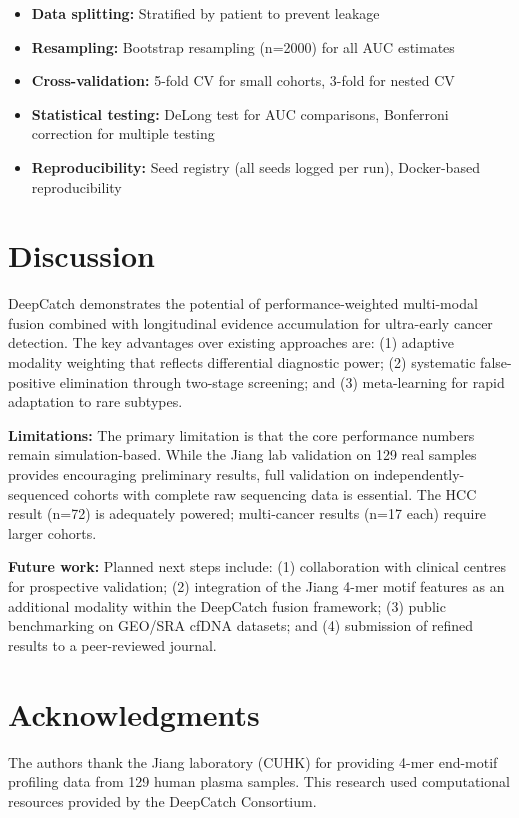 \documentclass[11pt,a4paper]{article}
\begin{document}
\begin{itemize}
    \item \textbf{Data splitting:} Stratified by patient to prevent leakage
    \item \textbf{Resampling:} Bootstrap resampling (n=2000) for all AUC estimates
    \item \textbf{Cross-validation:} 5-fold CV for small cohorts, 3-fold for nested CV
    \item \textbf{Statistical testing:} DeLong test for AUC comparisons, Bonferroni correction for multiple testing
    \item \textbf{Reproducibility:} Seed registry (all seeds logged per run), Docker-based reproducibility
\end{itemize}

\section{Discussion}

DeepCatch demonstrates the potential of performance-weighted multi-modal fusion combined with longitudinal evidence accumulation for ultra-early cancer detection. The key advantages over existing approaches are: (1) adaptive modality weighting that reflects differential diagnostic power; (2) systematic false-positive elimination through two-stage screening; and (3) meta-learning for rapid adaptation to rare subtypes.

\textbf{Limitations:} The primary limitation is that the core performance numbers remain simulation-based. While the Jiang lab validation on 129 real samples provides encouraging preliminary results, full validation on independently-sequenced cohorts with complete raw sequencing data is essential. The HCC result (n=72) is adequately powered; multi-cancer results (n=17 each) require larger cohorts.

\textbf{Future work:} Planned next steps include: (1) collaboration with clinical centres for prospective validation; (2) integration of the Jiang 4-mer motif features as an additional modality within the DeepCatch fusion framework; (3) public benchmarking on GEO/SRA cfDNA datasets; and (4) submission of refined results to a peer-reviewed journal.

\section*{Acknowledgments}

The authors thank the Jiang laboratory (CUHK) for providing 4-mer end-motif profiling data from 129 human plasma samples. This research used computational resources provided by the DeepCatch Consortium.
\end{document}
